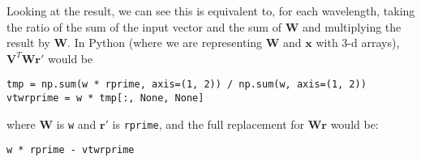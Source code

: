 \documentclass[12pt]{article}
\newcommand{\x}{\mathbf{x}}
\newcommand{\rvect}{\mathbf{r}}
\newcommand{\W}{\mathbf{W}}
\newcommand{\V}{\mathbf{V}}
\begin{document}
\noindent Looking at the result, we can see this is equivalent to, for
each wavelength, taking the ratio of the sum of the input vector and
the sum of $\W$ and multiplying the result by $\W$. In Python (where
we are representing $\W$ and $\x$ with 3-d arrays), $\V^T \W \mathbf{r'}$
would be

\begin{verbatim}
tmp = np.sum(w * rprime, axis=(1, 2)) / np.sum(w, axis=(1, 2))
vtwrprime = w * tmp[:, None, None]
\end{verbatim}

\noindent where $\W$ is \verb|w| and $\mathbf{r'}$ is \verb|rprime|, and the
full replacement for $\W \rvect$ would be:

\begin{verbatim}
w * rprime - vtwrprime
\end{verbatim}
\end{document}
